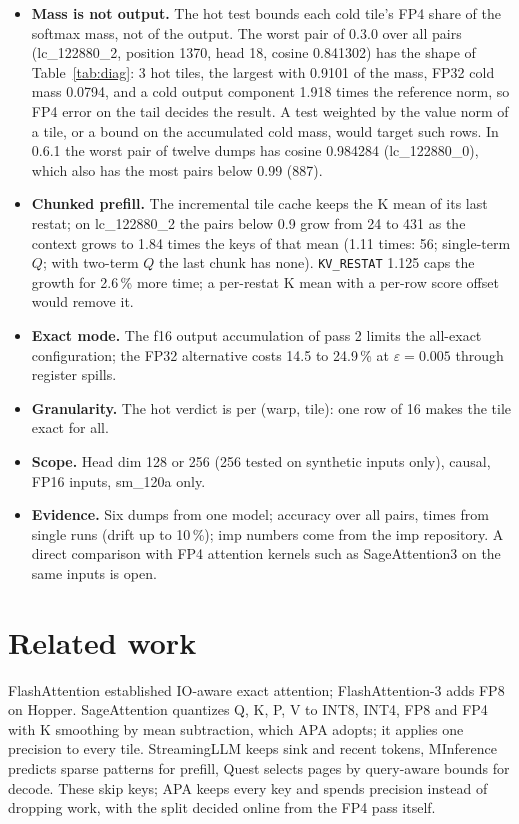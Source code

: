 \documentclass[10pt,twocolumn]{article}
\newcommand{\eps}{\varepsilon}
\newcommand{\code}[1]{\texttt{#1}}
\begin{document}
\begin{itemize}
\item \textbf{Mass is not output.} The hot test bounds each cold tile's FP4 share of the softmax mass, not
  of the output. The worst pair of 0.3.0 over all pairs (lc\_122880\_2, position 1370, head 18, cosine
  0.841302) has the shape of Table~\ref{tab:diag}: 3 hot tiles, the largest with 0.9101 of the mass, FP32
  cold mass 0.0794, and a cold output component 1.918 times the reference norm, so FP4 error on the tail
  decides the result. A test weighted by the value norm of a tile, or a bound on the accumulated cold mass,
  would target such rows. In 0.6.1 the worst pair of twelve dumps has cosine 0.984284 (lc\_122880\_0), which
  also has the most pairs below 0.99 (887).
\item \textbf{Chunked prefill.} The incremental tile cache keeps the K mean of its last restat; on
  lc\_122880\_2 the pairs below 0.9 grow from 24 to 431 as the context grows to 1.84 times the keys of that mean
  (1.11 times: 56; single-term $Q$; with two-term $Q$ the last chunk has none). \code{KV\_RESTAT} 1.125 caps the growth for 2.6\,\% more time; a per-restat K mean with a per-row score
  offset would remove it.
\item \textbf{Exact mode.} The f16 output accumulation of pass 2 limits the all-exact configuration;
  the FP32 alternative costs 14.5 to 24.9\,\% at $\eps=0.005$ through register spills.
\item \textbf{Granularity.} The hot verdict is per (warp, tile): one row of 16 makes the tile exact for all.
\item \textbf{Scope.} Head dim 128 or 256 (256 tested on synthetic inputs only), causal, FP16 inputs, sm\_120a only.
\item \textbf{Evidence.} Six dumps from one model; accuracy over all pairs, times from single runs
  (drift up to 10\,\%); imp numbers come from the imp repository. A direct
  comparison with FP4 attention kernels such as SageAttention3 \cite{zhang2025sageattention3} on the same
  inputs is open.
\end{itemize}

\section{Related work}

FlashAttention \cite{dao2022flashattention,dao2024flashattention2,shah2024flashattention3} established
IO-aware exact attention; FlashAttention-3 adds FP8 on Hopper. SageAttention
\cite{zhang2025sageattention,zhang2025sageattention2,zhang2025sageattention3} quantizes Q, K, P, V to INT8,
INT4, FP8 and FP4 with K smoothing by mean subtraction, which APA adopts; it applies one precision to every
tile. StreamingLLM \cite{xiao2024streamingllm} keeps sink and recent tokens, MInference
\cite{jiang2024minference} predicts sparse patterns for prefill, Quest \cite{tang2024quest} selects pages by
query-aware bounds for decode. These skip keys; APA keeps every key and spends precision instead of
dropping work, with the split decided online from the FP4 pass itself.
\end{document}

